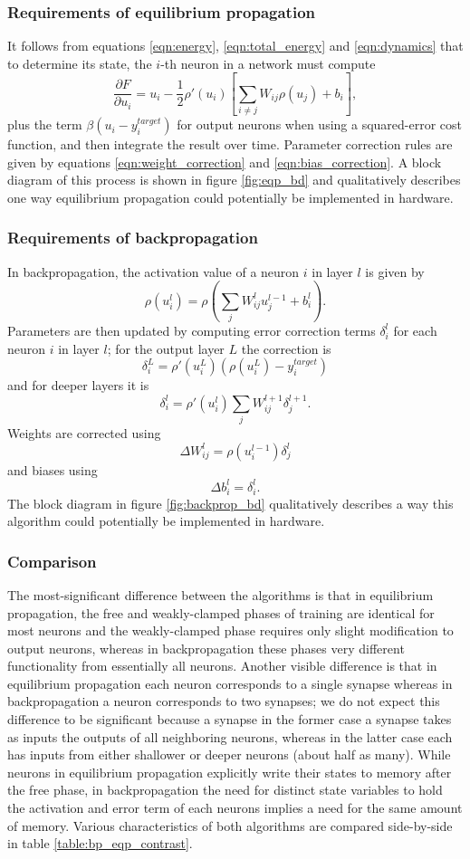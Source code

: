 \documentclass[utf8]{frontiersSCNS}
\begin{document}
\subsubsection{Requirements of equilibrium propagation}

It follows from equations \ref{eqn:energy}, \ref{eqn:total_energy} and \ref{eqn:dynamics} that to determine its state, the $i$-th neuron in a network must compute $$\frac{\partial F}{\partial u_i}=u_i-\frac{1}{2}\rho'(u_i)[\sum_{i\neq j}W_{ij}\rho(u_j)+b_i],$$ plus the term $\beta(u_i-y_i^{target})$ for output neurons when using a squared-error cost function, and then integrate the result over time. Parameter correction rules are given by equations \ref{eqn:weight_correction} and \ref{eqn:bias_correction}. A block diagram of this process is shown in figure \ref{fig:eqp_bd} and qualitatively describes one way equilibrium propagation could potentially be implemented in hardware.

\subsubsection{Requirements of backpropagation}

In backpropagation, the activation value of a neuron $i$ in layer $l$ is given by $$\rho(u_i^l)=\rho(\sum_jW_{ij}^lu_j^{l-1}+b_i^l).$$ Parameters are then updated by computing error correction terms $\delta_i^l$ for each neuron $i$ in layer $l$; for the output layer $L$ the correction is $$\delta_i^L=\rho'(u_i^L)(\rho(u_i^L)-y_i^{target})$$ and for deeper layers it is $$\delta_i^l=\rho'(u_i^l)\sum_jW_{ij}^{l+1}\delta_j^{l+1}.$$ Weights are corrected using $$\Delta W_{ij}^l=\rho(u_i^{l-1})\delta_j^l$$ and biases using $$\Delta b_i^l=\delta_i^l.$$ The block diagram in figure \ref{fig:backprop_bd} qualitatively describes a way this algorithm could potentially be implemented in hardware.

\subsubsection{Comparison}

The most-significant difference between the algorithms is that in equilibrium propagation, the free and weakly-clamped phases of training are identical for most neurons and the weakly-clamped phase requires only slight modification to output neurons, whereas in backpropagation these phases very different functionality from essentially all neurons. Another visible difference is that in equilibrium propagation each neuron corresponds to a single synapse whereas in backpropagation a neuron corresponds to two synapses; we do not expect this difference to be significant because a synapse in the former case a synapse takes as inputs the outputs of all neighboring neurons, whereas in the latter case each has inputs from either shallower or deeper neurons (about half as many). While neurons in equilibrium propagation explicitly write their states to memory after the free phase, in backpropagation the need for distinct state variables to hold the activation and error term of each neurons implies a need for the same amount of memory. Various characteristics of both algorithms are compared side-by-side in table \ref{table:bp_eqp_contrast}.
\end{document}
